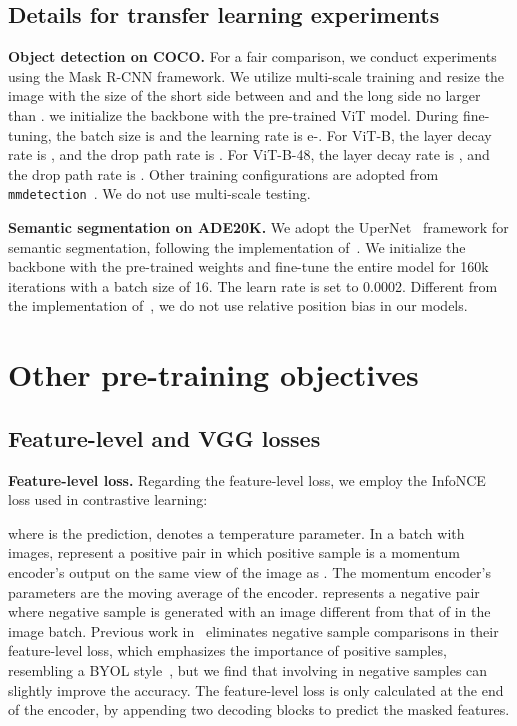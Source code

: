 \documentclass{article}
\begin{document}
\subsection{Details for transfer learning experiments}



\textbf{Object detection on COCO.} For a fair comparison, we conduct experiments using the Mask R-CNN framework. We utilize multi-scale training and resize the
image with the size of the short side
between  and  and the long side no larger than . 
we initialize the backbone with the pre-trained ViT model.
During fine-tuning, the batch size is  and the learning rate is e-. 
For ViT-B, the layer decay rate is , and the drop path rate is . 
For ViT-B-48, the layer decay rate is , and the drop path rate is . Other training configurations are adopted from \texttt{mmdetection}~\cite{chen2019mmdetection}. We do not use multi-scale testing.

\textbf{Semantic segmentation on ADE20K.} We adopt the UperNet~\cite{xiao2018unified} framework for semantic segmentation, following the implementation of~\cite{bao2021beit}. We initialize the backbone with the pre-trained weights and fine-tune the entire model for 160k iterations with a batch size of 16. The learn rate is set to 0.0002. Different from the implementation of~\cite{bao2021beit}, we do not use relative position bias in our models.



\section{Other pre-training objectives}
\subsection{Feature-level and VGG losses}
\textbf{Feature-level loss.}
Regarding the feature-level loss, we employ the InfoNCE loss used in contrastive learning:

where  is the prediction,  denotes a temperature parameter.
In a batch with  images,  represent a positive pair in which positive sample  is a momentum encoder's output on the same view of the image as . The momentum encoder's parameters are the moving average of the encoder.  represents a negative pair where negative sample  is generated with an image different from that of  in the image batch. Previous work in~\cite{chen2022sdae,dong2022bootstrapped} eliminates negative sample comparisons in their feature-level loss, which emphasizes the importance of positive samples, resembling a BYOL style~\cite{grill2020bootstrap}, but we find that involving in negative samples can slightly improve the accuracy. The feature-level loss is only calculated at the end of the encoder, by appending two decoding blocks to predict the masked features.
\end{document}
